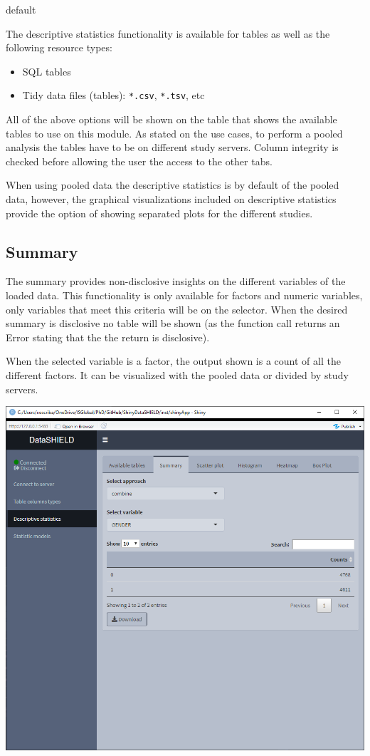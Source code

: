 \documentclass[
]{book}
\providecommand{\tightlist}{%
  \setlength{\itemsep}{0pt}\setlength{\parskip}{0pt}}
\begin{document}
default

The descriptive statistics functionality is available for tables as well as the following resource types:

\begin{itemize}
\tightlist
\item
  SQL tables
\item
  Tidy data files (tables): \texttt{*.csv}, \texttt{*.tsv}, etc
\end{itemize}

All of the above options will be shown on the table that shows the available tables to use on this module. As stated on the use cases, to perform a pooled analysis the tables have to be on different study servers. Column integrity is checked before allowing the user the access to the other tabs.

When using pooled data the descriptive statistics is by default of the pooled data, however, the graphical visualizations included on descriptive statistics provide the option of showing separated plots for the different studies.

\hypertarget{summary}{%
\subsection{Summary}\label{summary}}

The summary provides non-disclosive insights on the different variables of the loaded data. This functionality is only available for factors and numeric variables, only variables that meet this criteria will be on the selector. When the desired summary is disclosive no table will be shown (as the function call returns an Error stating that the the return is disclosive).

When the selected variable is a factor, the output shown is a count of all the different factors. It can be visualized with the pooled data or divided by study servers.

\includegraphics{images/descriptive_stats1.png}
\end{document}
